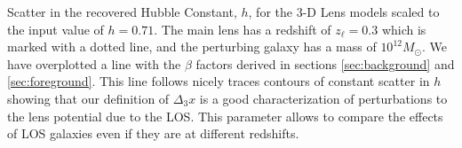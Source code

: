 \label{toyhd3x} Scatter in the recovered Hubble Constant, $h$, for the 3-D Lens models scaled to the input value of $h=0.71$. The main lens has a redshift of $z_\ell = 0.3$ which is marked with a dotted line, and the perturbing galaxy has a mass of $10^{12} M_\odot$. We have overplotted a line with the $\beta$ factors derived in sections \ref{sec:background} and \ref{sec:foreground}. This line follows nicely traces contours of constant scatter in $h$ showing that our definition of $\Delta_3 x$ is a good characterization of perturbations to the lens potential due to the LOS. This parameter allows to compare the effects of LOS galaxies even if they are at different redshifts.
  